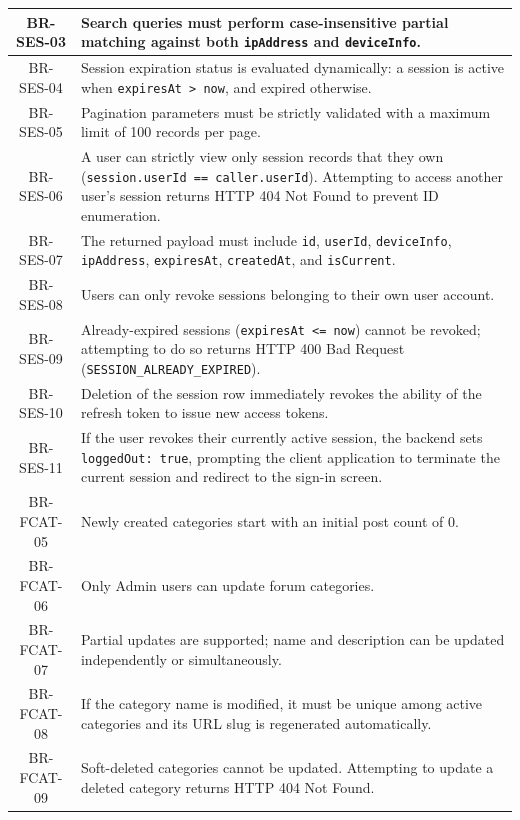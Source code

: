 \begin{longtable}{|c|p{12cm}|}
    BR-SES-03 & Search queries must perform case-insensitive partial matching against both \texttt{ipAddress} and \texttt{deviceInfo}. \\ \hline
    BR-SES-04 & Session expiration status is evaluated dynamically: a session is active when \texttt{expiresAt > now}, and expired otherwise. \\ \hline
    BR-SES-05 & Pagination parameters must be strictly validated with a maximum limit of 100 records per page. \\ \hline
    BR-SES-06 & A user can strictly view only session records that they own (\texttt{session.user\allowbreak Id == caller.user\allowbreak Id}). Attempting to access another user's session returns HTTP 404 Not Found to prevent ID enumeration. \\ \hline
    BR-SES-07 & The returned payload must include \texttt{id}, \texttt{userId}, \texttt{deviceInfo}, \texttt{ipAddress}, \texttt{expiresAt}, \texttt{createdAt}, and \texttt{isCurrent}. \\ \hline
    BR-SES-08 & Users can only revoke sessions belonging to their own user account. \\ \hline
    BR-SES-09 & Already-expired sessions (\texttt{expiresAt <= now}) cannot be revoked; attempting to do so returns HTTP 400 Bad Request (\texttt{SESSION\_ALREADY\_EXPIRED}). \\ \hline
    BR-SES-10 & Deletion of the session row immediately revokes the ability of the refresh token to issue new access tokens. \\ \hline
    BR-SES-11 & If the user revokes their currently active session, the backend sets \texttt{loggedOut: true}, prompting the client application to terminate the current session and redirect to the sign-in screen. \\ \hline
    BR-FCAT-05 & Newly created categories start with an initial post count of 0. \\ \hline
    BR-FCAT-06 & Only Admin users can update forum categories. \\ \hline
    BR-FCAT-07 & Partial updates are supported; name and description can be updated independently or simultaneously. \\ \hline
    BR-FCAT-08 & If the category name is modified, it must be unique among active categories and its URL slug is regenerated automatically. \\ \hline
    BR-FCAT-09 & Soft-deleted categories cannot be updated. Attempting to update a deleted category returns HTTP 404 Not Found. \\ \hline

\end{longtable}
